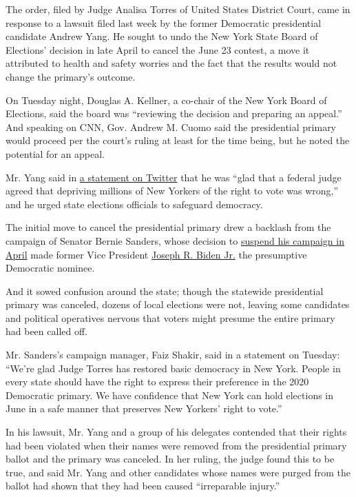 The order, filed by Judge Analisa Torres of United States District
Court, came in response to a lawsuit filed last week by the former
Democratic presidential candidate Andrew Yang. He sought to undo the New
York State Board of Elections' decision in late April to cancel the June
23 contest, a move it attributed to health and safety worries and the
fact that the results would not change the primary's outcome.

On Tuesday night, Douglas A. Kellner, a co-chair of the New York Board
of Elections, said the board was ``reviewing the decision and preparing
an appeal.'' And speaking on CNN, Gov. Andrew M. Cuomo said the
presidential primary would proceed per the court's ruling at least for
the time being, but he noted the potential for an appeal.

Mr. Yang said in
\href{https://twitter.com/AndrewYang/status/1257826412851011584}{a
statement on Twitter} that he was ``glad that a federal judge agreed
that depriving millions of New Yorkers of the right to vote was wrong,''
and he urged state elections officials to safeguard democracy.

The initial move to cancel the presidential primary drew a backlash from
the campaign of Senator Bernie Sanders, whose decision to
\href{https://www.nytimes3xbfgragh.onion/2020/04/08/us/politics/bernie-sanders-drops-out.html}{suspend
his campaign in April} made former Vice President
\href{https://www.nytimes3xbfgragh.onion/interactive/2020/us/elections/joe-biden.html}{Joseph
R. Biden Jr.} the presumptive Democratic nominee.

And it sowed confusion around the state; though the statewide
presidential primary was canceled, dozens of local elections were not,
leaving some candidates and political operatives nervous that voters
might presume the entire primary had been called off.

Mr. Sanders's campaign manager, Faiz Shakir, said in a statement on
Tuesday: ``We're glad Judge Torres has restored basic democracy in New
York. People in every state should have the right to express their
preference in the 2020 Democratic primary. We have confidence that New
York can hold elections in June in a safe manner that preserves New
Yorkers' right to vote.''

In his lawsuit, Mr. Yang and a group of his delegates contended that
their rights had been violated when their names were removed from the
presidential primary ballot and the primary was canceled. In her ruling,
the judge found this to be true, and said Mr. Yang and other candidates
whose names were purged from the ballot had shown that they had been
caused ``irreparable injury.''

